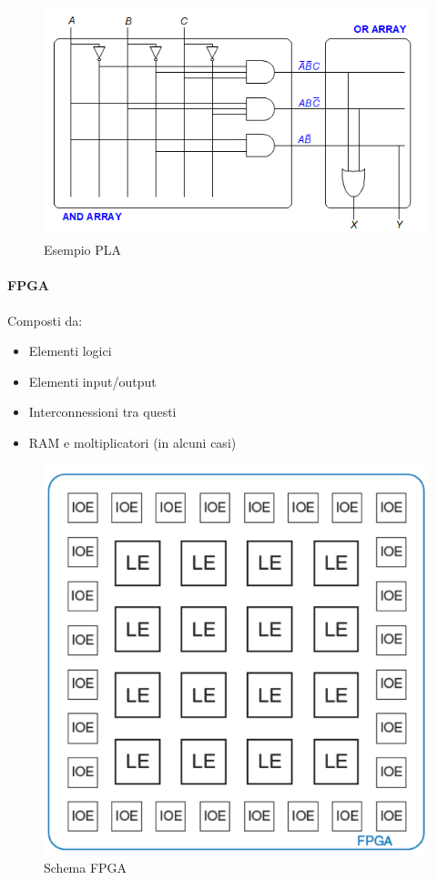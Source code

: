 \documentclass{article}
\begin{document}
\begin{figure}[ht]
    \centering
    \includegraphics[width=\linewidth]{PLA.png}
    \caption{Esempio PLA}
    \label{fig:pla}
\end{figure}

\newpage

\paragraph{FPGA}

Composti da:
\begin{itemize}
    \item Elementi logici
    \item Elementi input/output
    \item Interconnessioni tra questi
    \item RAM e moltiplicatori (in alcuni casi)
\end{itemize}

\begin{figure}[ht]
    \centering
    \includegraphics[width=.7\linewidth]{FPGA.png}
    \caption{Schema FPGA}
    \label{fig:fpga}
\end{figure}
\end{document}
